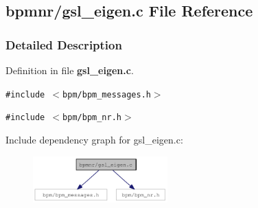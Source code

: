 \subsection{bpmnr/gsl\_\-eigen.c File Reference}
\label{gsl__eigen_8c}


\subsubsection{Detailed Description}


Definition in file {\bf gsl\_\-eigen.c}.

{\tt \#include $<$bpm/bpm\_\-messages.h$>$}\par
{\tt \#include $<$bpm/bpm\_\-nr.h$>$}\par


Include dependency graph for gsl\_\-eigen.c:\nopagebreak
\begin{figure}[H]
\begin{center}
\leavevmode
\includegraphics[width=147pt]{gsl__eigen_8c__incl}
\end{center}
\end{figure}
